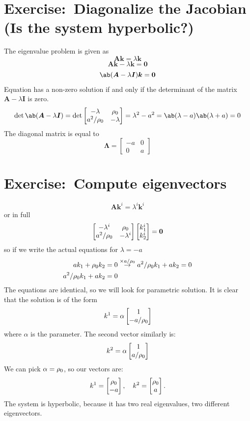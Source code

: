 \documentclass[justified, nobib,a4paper]{tufte-handout}
\newcommand{\Q}[1]{\section{Exercise:~{#1}}}
\begin{document}
\Q{Diagonalize the Jacobian (Is the system hyperbolic?)}
The eigenvalue problem is given as
\[
	\bm{A}\bm{k} = \lambda \bm{k}
\]
\[
	\bm{A}\bm{k} - \lambda \bm{k} = \bm{0}
\]
\[
	\ab(\bm{A} - \lambda \bm{I})\bm{k} = \bm{0}
\]
Equation has a non-zero solution if and only if the determinant of the matrix \(\bm{A} - \lambda \bm{I}\) is zero.
\[
	\det \ab(\bm{A} - \lambda \bm{I}) =\det \begin{bmatrix}
		-\lambda  & \rz      \\
		a^2 / \rz & -\lambda
	\end{bmatrix} = \lambda^2 - a^2 = \ab(\lambda - a)\ab(\lambda + a) = 0
\]
The diagonal matrix is equal to
\[
	\bm{\Lambda} = \begin{bmatrix}
		-a & 0 \\
		0  & a
	\end{bmatrix}
\]
\Q{Compute eigenvectors}
\[
	\bm{A}\bm{k}^i = \lambda^i \bm{k}^i
\]
or in full
\[
	\begin{bmatrix}
		-\lambda^i & \rho_0        \\
		a^2 / \rho_0  & -\lambda^i
	\end{bmatrix}
	\begin{bmatrix}
		k^i_1 \\
		k^i_2
	\end{bmatrix} = \bm{0}
\]
so if we write the actual equations for \(\lambda = -a\)
\[
	\begin{split}
		a k_1 + \rho_0 k_2     & = 0  \stackrel{\times a/\rho_0}{\rightarrow}  a^2/\rho_0 k_1 + a k_2 = 0 \\
		a^2/\rho_0 k_1 + a k_2 & = 0
	\end{split}
\]
The equations are identical, so we will look for parametric solution.
It is clear that the solution is of the form
\[
	k^1 = \alpha\begin{bmatrix}
		1 \\
		-a/\rho_0
	\end{bmatrix}
\]
where \(\alpha\) is the parameter.
The second vector similarly is:
\[
	k^2 = \alpha\begin{bmatrix}
		1 \\
		a/\rho_0
	\end{bmatrix}
\]
We can pick \(\alpha = \rho_0\), so our vectors are:
\[
	k^1 = \begin{bmatrix}
		\rho_0 \\
		-a
	\end{bmatrix},\quad
	k^2 = \begin{bmatrix}
		\rho_0 \\
		a
	\end{bmatrix}.
\]
The system is hyperbolic, because it has two real eigenvalues, two different eigenvectors.
\end{document}
